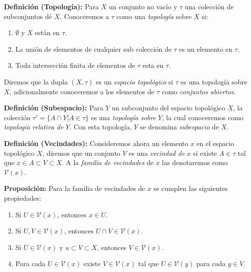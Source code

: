 \textbf{Definición (Topología):} Para $X$ un conjunto no vacío y $\tau$ una colección de subconjuntos dé $X$. Conoceremos a $\tau$ como una \textit{topología} sobre $X$ si:

\begin{enumerate}
    \item $\emptyset$ y $X$ están en $\tau$.
    \item La unión de elementos de cualquier sub colección de $\tau$ es un elemento en $\tau$.
    \item Toda intersección finita de elementos de $\tau$ esta en $\tau$.
\end{enumerate}

Diremos que la dupla $(X,\tau)$ es un \textit{espacio topológico} si $\tau$ es una topología sobre $X$, adicionalmente conoceremos a los elementos de $\tau$ como \textit{conjuntos abiertos}. 

\textbf{Definición (Subespacio):} Para $Y$ un subconjunto del espacio topológico $X$, la colección $\tau'=\{A\cap Y|A\in \tau\}$ es una \textit{topología sobre} $Y$, la cual conoceremos como \textit{topología relativa de} $Y$. Con esta topología, $Y$ se denomina \textit{subespacio} de $X$.

\textbf{Definición (Vecindades):} Consideremos ahora un elemento $x$ en el espacio topológico $X$, diremos que un conjunto $V$ es una \textit{vecindad de} $x$ si existe $A\in\tau$ tal que $x\in A\subset V\subset X$. A la \textit{familia de vecindades} de $x$ las denotaremos como $\mathcal{V}(x)$. 

\textbf{Proposición:} Para la familia de vecindades de $x$ se cumplen las siguientes propiedades:

\begin{enumerate}
    \item Si $U\in\mathcal{V}(x)$, entonces $x\in U$.
    \item Si $U,V\in\mathcal{V}(x)$, entonces $U\cap V\in\mathcal{V}(x)$.
    \item Si $U\in\mathcal{V}(x)$ y $u\subset V\subset X$, entonces $V\in\mathcal{V}(x)$.
    \item Para cada $U\in\mathcal{V}(x)$ existe $V\in\mathcal{V}(x)$ tal que $U\in\mathcal{V}(y)$ para cada $y\in V$.
\end{enumerate}


